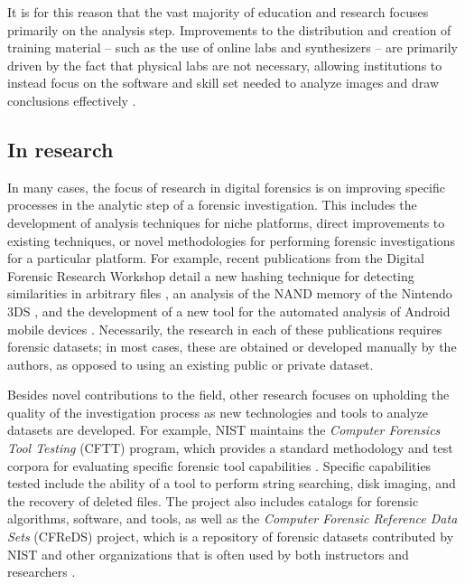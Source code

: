 \documentclass[letterpaper,12pt]{report}
\begin{document}
It is for this reason that the vast majority of education and research
focuses primarily on the analysis step. Improvements to the distribution
and creation of training material -- such as the use of online labs and
synthesizers -- are primarily driven by the fact that physical labs are
not necessary, allowing institutions to instead focus on the software
and skill set needed to analyze images and draw conclusions effectively
\cite{bruecknerAutomatedComputerForensics2008,lawrenceFrameworkDesignWebbased2009}.

\subsection{In research}\label{in-research}

In many cases, the focus of research in digital forensics is on
improving specific processes in the analytic step of a forensic
investigation. This includes the development of analysis techniques for
niche platforms, direct improvements to existing techniques, or novel
methodologies for performing forensic investigations for a particular
platform. For example, recent publications from the Digital Forensic
Research Workshop detail a new hashing technique for detecting
similarities in arbitrary files \cite{changFbHashNewSimilarity2019},
an analysis of the NAND memory of the Nintendo 3DS
\cite{pessolanoForensicAnalysisNintendo2019}, and the development of
a new tool for the automated analysis of Android mobile devices
\cite{linAutomatedForensicAnalysis2018}. Necessarily, the research
in each of these publications requires forensic datasets; in most cases,
these are obtained or developed manually by the authors, as opposed to
using an existing public or private dataset.

Besides novel contributions to the field, other research focuses on
upholding the quality of the investigation process as new technologies
and tools to analyze datasets are developed. For example, NIST maintains
the \emph{Computer Forensics Tool Testing} (CFTT) program, which
provides a standard methodology and test corpora for evaluating specific
forensic tool capabilities
\cite{nationalinstituteofstandardsandtechnologyComputerForensicsTool2017}.
Specific capabilities tested include the ability of a tool to perform
string searching, disk imaging, and the recovery of deleted files. The
project also includes catalogs for forensic algorithms, software, and
tools, as well as the \emph{Computer Forensic Reference Data Sets}
(CFReDS) project, which is a repository of forensic datasets contributed
by NIST and other organizations that is often used by both instructors
and researchers
\cite{nationalinstituteofstandardsandtechnologyCFReDSPortal}.
\end{document}
